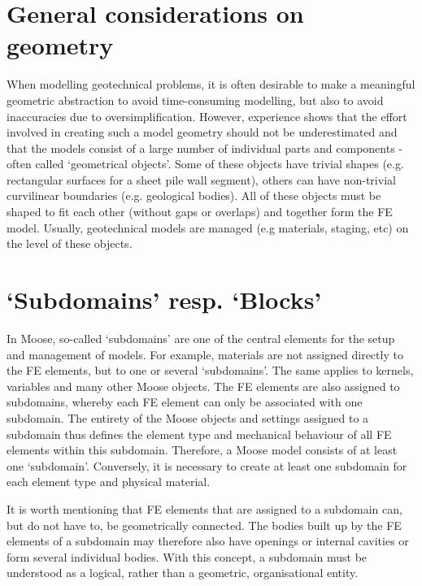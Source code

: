 \section{General considerations on geometry}
\label{geometry-general}

When modelling geotechnical problems, it is often desirable to make a
meaningful geometric abstraction to avoid time-consuming modelling, but also to
avoid inaccuracies due to oversimplification. However, experience shows that
the effort involved in creating such a model geometry should not be
underestimated and that the models consist of a large number of individual
parts and components - often called ‘geometrical objects’. Some of these
objects have trivial shapes (e.g. rectangular surfaces for a sheet pile wall
segment), others can have non-trivial curvilinear boundaries (e.g. geological
bodies). All of these objects must be shaped to fit each other (without gaps or
overlaps) and together form the FE model. Usually, geotechnical models are
managed (e.g materials, staging, etc) on the level of these objects.

\section{‘Subdomains’ resp. ‘Blocks’}
\label{geometry-blocks-and-subdomains}

In Moose, so-called ‘subdomains’ are one of the central elements for the setup
and management of models. For example, materials are not assigned directly to
the FE elements, but to one or several ‘subdomains’. The same applies to
kernels, variables and many other Moose objects. The FE elements are also
assigned to subdomains, whereby each FE element can only be associated with one
subdomain. The entirety of the Moose objects and settings assigned to a
subdomain thus defines the element type and mechanical behaviour of all FE
elements within this subdomain. Therefore, a Moose model consists of at least
one ‘subdomain’. Conversely, it is necessary to create at least one subdomain
for each element type and physical material.

It is worth mentioning that FE elements that are assigned to a subdomain can,
but do not have to, be geometrically connected. The bodies built up by the FE
elements of a subdomain may therefore also have openings or internal cavities
or form several individual bodies. With this concept, a subdomain must be
understood as a logical, rather than a geometric, organisational entity.

